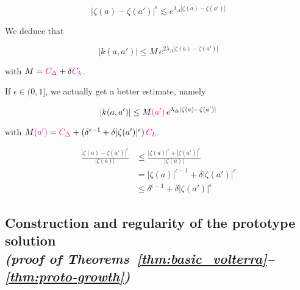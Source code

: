 \documentclass{article}
\theoremstyle{plain}
\newenvironment{verify}{\color{ForestGreen}}{\color{black}}
\begin{document}
\[|\zeta(a)-\zeta(a')|^\epsilon\lesssim e^{\lambda_\Delta |\zeta(a)-\zeta(a')|} \]

We deduce that 

\[ |k(a,a')| \leq M\, e^{2 \lambda_\Delta |\zeta(a)-\zeta(a')|} \]

with $M= \textcolor{magenta}{C_\Delta} + \delta \textcolor{magenta}{C_k}$. 

\color{purple}If $\epsilon\in (0,1]$, we actually get a better estimate, namely 

\[ |k(a,a')| \leq M\textcolor{magenta}{(a')}\, e^{ \lambda_\Delta |\zeta(a)-\zeta(a')|} \]

with $M\textcolor{magenta}{(a')} = \textcolor{magenta}{C_\Delta} + (\delta^{\epsilon-1}+\delta |\zeta(a')|^\epsilon ) \,  \textcolor{magenta}{C_k}$.\color{black}

\begin{verify}
    \begin{align*}
        \frac{|\zeta(a)-\zeta(a')|^\epsilon}{|\zeta(a)|} & \leq \frac{|\zeta(a)|^\epsilon + |\zeta(a')|^\epsilon}{|\zeta(a)|}\\
        &= |\zeta(a)|^{\epsilon-1}+ \delta |\zeta(a')|^\epsilon\\
        &\leq \delta^{\epsilon-1}+ \delta |\zeta(a')|^\epsilon 
    \end{align*}
\end{verify}
\color{black}





\subsection{Construction and regularity of the prototype solution \\ \textit{(proof of Theorems~\ref{thm:basic_volterra}--\ref{thm:proto-growth})}}\label{sec:proto-construction-regularity}
\end{document}
